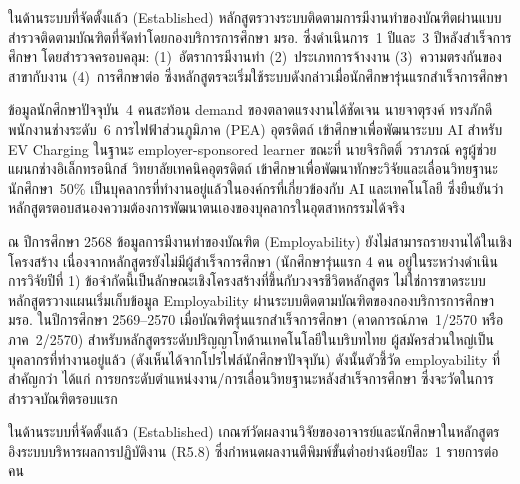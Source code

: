 
ในด้านระบบที่จัดตั้งแล้ว (Established) หลักสูตรวางระบบติดตามการมีงานทำของบัณฑิตผ่านแบบสำรวจติดตามบัณฑิตที่จัดทำโดยกองบริการการศึกษา มรอ. ซึ่งดำเนินการ~1 ปีและ~3 ปีหลังสำเร็จการศึกษา โดยสำรวจครอบคลุม: (1)~อัตราการมีงานทำ (2)~ประเภทการจ้างงาน (3)~ความตรงกันของสาขากับงาน (4)~การศึกษาต่อ ซึ่งหลักสูตรจะเริ่มใช้ระบบดังกล่าวเมื่อนักศึกษารุ่นแรกสำเร็จการศึกษา

ข้อมูลนักศึกษาปัจจุบัน~4 คนสะท้อน demand ของตลาดแรงงานได้ชัดเจน นายจาตุรงค์ ทรงภักดี พนักงานช่างระดับ~6 การไฟฟ้าส่วนภูมิภาค (PEA) อุตรดิตถ์ เข้าศึกษาเพื่อพัฒนาระบบ AI สำหรับ EV Charging ในฐานะ employer-sponsored learner ขณะที่ นายจิรกิตติ์ วราภรณ์ ครูผู้ช่วยแผนกช่างอิเล็กทรอนิกส์ วิทยาลัยเทคนิคอุตรดิตถ์ เข้าศึกษาเพื่อพัฒนาทักษะวิจัยและเลื่อนวิทยฐานะ นักศึกษา~50\% เป็นบุคลากรที่ทำงานอยู่แล้วในองค์กรที่เกี่ยวข้องกับ AI และเทคโนโลยี ซึ่งยืนยันว่าหลักสูตรตอบสนองความต้องการพัฒนาตนเองของบุคลากรในอุตสาหกรรมได้จริง

ณ ปีการศึกษา 2568 ข้อมูลการมีงานทำของบัณฑิต (Employability) ยังไม่สามารถรายงานได้ในเชิงโครงสร้าง เนื่องจากหลักสูตรยังไม่มีผู้สำเร็จการศึกษา (นักศึกษารุ่นแรก 4 คน อยู่ในระหว่างดำเนินการวิจัยปีที่ 1) ข้อจำกัดนี้เป็นลักษณะเชิงโครงสร้างที่ขึ้นกับวงจรชีวิตหลักสูตร ไม่ใช่การขาดระบบ หลักสูตรวางแผนเริ่มเก็บข้อมูล Employability ผ่านระบบติดตามบัณฑิตของกองบริการการศึกษา มรอ. ในปีการศึกษา 2569--2570 เมื่อบัณฑิตรุ่นแรกสำเร็จการศึกษา (คาดการณ์ภาค~1/2570 หรือภาค~2/2570) สำหรับหลักสูตรระดับปริญญาโทด้านเทคโนโลยีในบริบทไทย ผู้สมัครส่วนใหญ่เป็นบุคลากรที่ทำงานอยู่แล้ว (ดังเห็นได้จากโปรไฟล์นักศึกษาปัจจุบัน) ดังนั้นตัวชี้วัด employability ที่สำคัญกว่า ได้แก่ การยกระดับตำแหน่งงาน/การเลื่อนวิทยฐานะหลังสำเร็จการศึกษา ซึ่งจะวัดในการสำรวจบัณฑิตรอบแรก


ในด้านระบบที่จัดตั้งแล้ว (Established) เกณฑ์วัดผลงานวิจัยของอาจารย์และนักศึกษาในหลักสูตรอิงระบบบริหารผลการปฏิบัติงาน (R5.8) ซึ่งกำหนดผลงานตีพิมพ์ขั้นต่ำอย่างน้อยปีละ~1 รายการต่อคน

